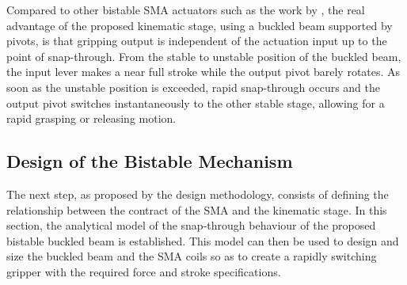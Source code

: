 Compared to other bistable SMA actuators such as the work by \todocite, the real advantage of the proposed kinematic stage, using a buckled beam supported by pivots, is that gripping output is independent of the actuation input up to the point of snap-through. From the stable to unstable position of the buckled beam, the input lever makes a near full stroke while the output pivot barely rotates. As soon as the unstable position is exceeded, rapid snap-through occurs and the output pivot switches instantaneously to the other stable stage, allowing for a rapid grasping or releasing motion.
\subsection{Design of the Bistable Mechanism}
The next step, as proposed by the design methodology, consists of defining the relationship between the contract of the SMA and the kinematic stage. In this section, the analytical model of the snap-through behaviour of the proposed bistable buckled beam is established. This model can then be used to design and size the buckled beam and the SMA coils so as to create a rapidly switching gripper with the required force and stroke specifications.
